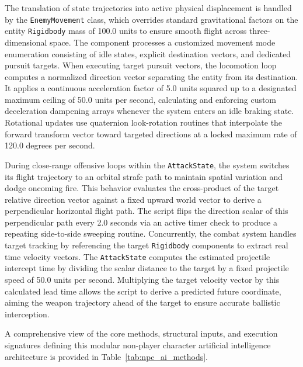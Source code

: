\documentclass[12pt]{report}
\begin{document}
The translation of state trajectories into active physical displacement is handled by the \texttt{EnemyMovement} class, which overrides standard gravitational factors on the entity \texttt{Rigidbody} mass of 100.0 units to ensure smooth flight across three-dimensional space. The component processes a customized movement mode enumeration consisting of idle states, explicit destination vectors, and dedicated pursuit targets. When executing target pursuit vectors, the locomotion loop computes a normalized direction vector separating the entity from its destination. It applies a continuous acceleration factor of 5.0 units squared up to a designated maximum ceiling of 50.0 units per second, calculating and enforcing custom deceleration dampening arrays whenever the system enters an idle braking state. Rotational updates use quaternion look-rotation routines that interpolate the forward transform vector toward targeted directions at a locked maximum rate of 120.0 degrees per second.

During close-range offensive loops within the \texttt{AttackState}, the system switches its flight trajectory to an orbital strafe path to maintain spatial variation and dodge oncoming fire. This behavior evaluates the cross-product of the target relative direction vector against a fixed upward world vector to derive a perpendicular horizontal flight path. The script flips the direction scalar of this perpendicular path every 2.0 seconds via an active timer check to produce a repeating side-to-side sweeping routine. Concurrently, the combat system handles target tracking by referencing the target \texttt{Rigidbody} components to extract real time velocity vectors. The \texttt{AttackState} computes the estimated projectile intercept time by dividing the scalar distance to the target by a fixed projectile speed of 50.0 units per second. Multiplying the target velocity vector by this calculated lead time allows the script to derive a predicted future coordinate, aiming the weapon trajectory ahead of the target to ensure accurate ballistic interception.

A comprehensive view of the core methods, structural inputs, and execution signatures defining this modular non-player character artificial intelligence architecture is provided in Table~\ref{tab:npc_ai_methods}.
\end{document}
